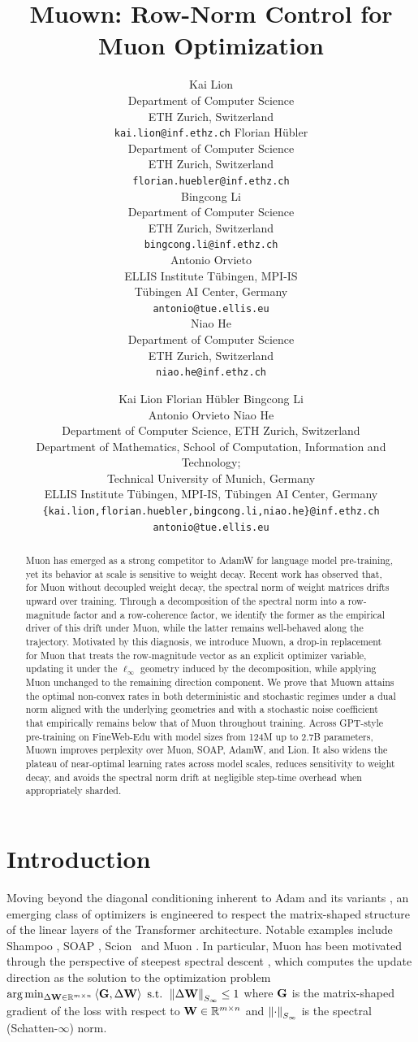 \documentclass{article}
\title{Muown: Row-Norm Control for Muon Optimization}
\author{%
  Kai Lion\\
  Department of Computer Science\\
  ETH Zurich, Switzerland\\
  \texttt{kai.lion@inf.ethz.ch}
  \And
  Florian Hübler\\
  Department of Computer Science\\
  ETH Zurich, Switzerland\\
  \texttt{florian.huebler@inf.ethz.ch} 
  \And
  \\
  Bingcong Li\\
  Department of Computer Science\\
  ETH Zurich, Switzerland\\
  \texttt{bingcong.li@inf.ethz.ch} 
  \And
  \\
  Antonio Orvieto\\
  ELLIS Institute Tübingen, MPI-IS\\
  Tübingen AI Center, Germany\\
  \texttt{antonio@tue.ellis.eu}
  \And
  \\
  Niao He\\
  Department of Computer Science\\
  ETH Zurich, Switzerland\\
  \texttt{niao.he@inf.ethz.ch} \\
}
\author{%
\begin{minipage}{0.94\textwidth}
\centering
{\large
Kai Lion\affmark{1}\quad
Florian H\"ubler\affmark{1,2}\quad
Bingcong Li\affmark{1}\\[-0.1ex]
Antonio Orvieto\affmark{3}\quad
Niao He\affmark{1}
}\\[0.7em]
{\small
\affmark{1} Department of Computer Science, ETH Zurich, Switzerland\\[-0.05ex]
\affmark{2} Department of Mathematics, School of Computation, Information and Technology;\\[-0.05ex]
Technical University of Munich, Germany\\[-0.05ex]
\affmark{3} ELLIS Institute Tübingen, MPI-IS, Tübingen AI Center, Germany\\[0.6em]
\texttt{\{kai.lion,florian.huebler,bingcong.li,niao.he\}@inf.ethz.ch}\\[-0.05ex]
\texttt{antonio@tue.ellis.eu}
}
\end{minipage}%
}
\newcommand{\algname}{Muown}
\begin{document}
\maketitle


\begin{abstract}
Muon has emerged as a strong competitor to AdamW for language model pre-training, yet its behavior at scale is sensitive to weight decay. Recent work has observed that, for Muon without decoupled weight decay, the spectral norm of weight matrices drifts upward over training. Through a decomposition of the spectral norm into a row-magnitude factor and a row-coherence factor, we identify the former as the empirical driver of this drift under Muon, while the latter remains well-behaved along the trajectory. Motivated by this diagnosis, we introduce \algname{}, a drop-in replacement for Muon that treats the row-magnitude vector as an explicit optimizer variable, updating it under the $\ell_\infty$ geometry induced by the decomposition, while applying Muon unchanged to the remaining direction component. We prove that \algname{} attains the optimal non-convex rates in both deterministic and stochastic regimes under a dual norm aligned with the underlying geometries and with a stochastic noise coefficient that empirically remains below that of Muon throughout training. Across GPT-style pre-training on FineWeb-Edu with model sizes from 124M up to 2.7B parameters, \algname{} improves perplexity over Muon, SOAP, AdamW, and Lion. It also widens the plateau of near-optimal learning rates across model scales, reduces sensitivity to weight decay, and avoids the spectral norm drift at negligible step-time overhead when appropriately sharded. 
\end{abstract}

\section{Introduction}

Moving beyond the diagonal conditioning inherent to Adam and its variants \citep{kingma_adam_2015, loshchilov_decoupled_2019}, an emerging class of optimizers is engineered to respect the matrix-shaped structure of the linear layers of the Transformer architecture. Notable examples include Shampoo \citep{gupta_shampoo_2018}, SOAP \citep{vyas_soap_2024}, Scion~\citep{pethick_training_2025} and Muon \citep{jordan2024muon}. In particular, Muon has been motivated through the perspective of steepest spectral descent \citep{carlson_stochastic_2015}, which computes the update direction as the solution to the optimization problem $\arg \min_{\Delta \mathbf{W} \in \mathbb{R}^{m \times n}} \left \langle \mathbf{G}, \Delta \mathbf{W} \right \rangle \text{ s.t. } \left \| \Delta \mathbf{W} \right\|_{S_\infty} \leq 1$ where $\mathbf{G}$ is the matrix-shaped gradient of the loss with respect to $\mathbf{W} \in \mathbb{R}^{m \times n}$ and $\left \| \cdot \right\|_{S_\infty}$ is the spectral (Schatten-$\infty$) norm. 
\end{document}
